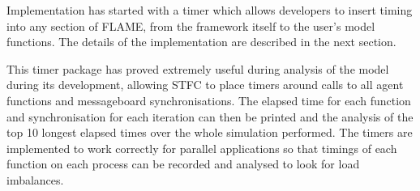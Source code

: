 Implementation has started with a timer which allows developers to insert timing into any section of FLAME, from the framework itself to the user's model functions. The details of the implementation are described in the next section. 

This timer package has proved extremely useful during analysis of the model during its development, allowing STFC to place timers around calls to all agent functions and messageboard synchronisations. The elapsed time for each function and synchronisation for each iteration can then be printed and the analysis of the top 10 longest elapsed times over the whole simulation performed. The timers are implemented to work correctly for parallel applications so that timings of each function on each process can be recorded and analysed to look for load imbalances.

